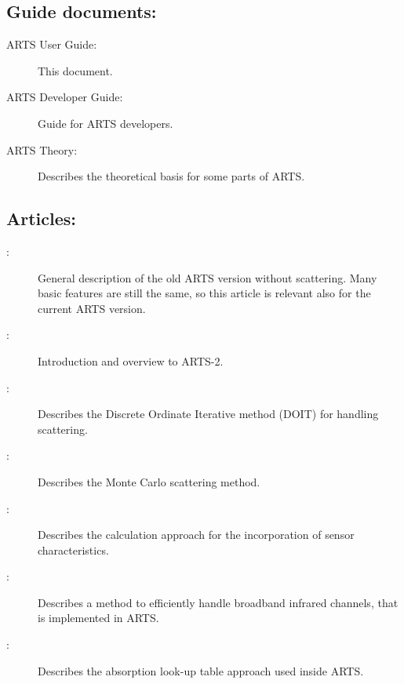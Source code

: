 \subsection{Guide documents:}
\begin{description}
\item[ARTS User Guide:] This document.
\item[ARTS Developer Guide:] Guide for ARTS developers.
\item[ARTS Theory:] Describes the theoretical basis for some parts of ARTS.
\end{description}

\subsection{Articles:}
\begin{description}
\item[\citet{buehler:artst:05}:] General description of the old ARTS
  version without scattering. Many basic features are still the same,
  so this article is relevant also for the current ARTS version.
\item[\citet{eriksson:arts2:11}:] Introduction and overview to ARTS-2.
\item[\citet{emde04:_doit_jgr}:] Describes the Discrete Ordinate Iterative
  method (DOIT) for handling scattering.
\item[\citet{davisetal:04}:] Describes the Monte Carlo scattering method.
\item[\citet{eriksson:06}:] Describes the calculation approach for the
  incorporation of sensor characteristics.
\item[\citet{buehler:effic:10}:] Describes a method to efficiently handle
  broadband infrared channels, that is implemented in ARTS.
\item[\citet{buehler:absor:11}:] Describes the absorption look-up table
  approach used inside ARTS.
\end{description}

